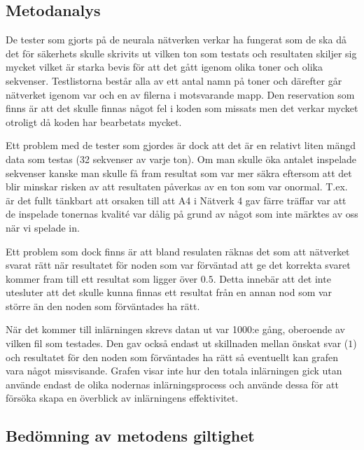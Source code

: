 \documentclass[a4paper,10pt]{article}
\begin{document}
\subsection{Metodanalys}

De tester som gjorts på de neurala nätverken verkar ha fungerat som de ska då det för säkerhets skulle skrivits ut vilken ton som testats och resultaten skiljer sig mycket vilket är starka bevis för att det gått igenom olika toner och olika sekvenser. Testlistorna består alla av ett antal namn på toner och därefter går nätverket igenom var och en av filerna i motsvarande mapp. Den reservation som finns är att det skulle finnas något fel i koden som missats men det verkar mycket otroligt då koden har bearbetats mycket.\\\par
Ett problem med de tester som gjordes är dock att det är en relativt liten mängd data som testas (32 sekvenser av varje ton). Om man skulle öka antalet inspelade sekvenser kanske man skulle få fram resultat som var mer säkra eftersom att det blir minskar risken av att resultaten påverkas av en ton som var onormal. T.ex. är det fullt tänkbart att orsaken till att A4 i Nätverk 4 gav färre träffar var att de inspelade tonernas kvalité var dålig på grund av något som inte märktes av oss när vi spelade in. \par
Ett problem som dock finns är att bland resulaten räknas det som att nätverket svarat rätt när resultatet för noden som var förväntad att ge det korrekta svaret kommer fram till ett resultat som ligger över $0.5$. Detta innebär att det inte utesluter att det skulle kunna finnas ett resultat från en annan nod som var större än den noden som förväntades ha rätt. 
\\\par
När det kommer till inlärningen skrevs datan ut var 1000:e gång, oberoende av vilken fil som testades. Den gav också endast ut skillnaden mellan önskat svar ($1$) och resultatet för den noden som förväntades ha rätt så eventuellt kan grafen vara något missvisande. Grafen visar inte hur den totala inlärningen gick utan använde endast de olika nodernas inlärningsprocess och använde dessa för att försöka skapa en överblick av inlärningens effektivitet.


\subsection{Bedömning av metodens giltighet}

\end{document}
